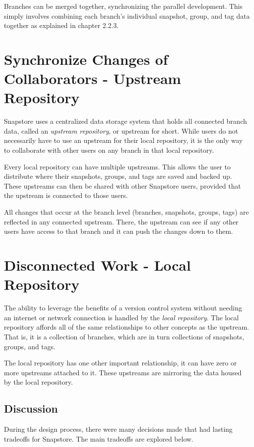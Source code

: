 Branches can be merged together, synchronizing the parallel development. This simply involves combining each branch's individual snapshot, group, and tag data together as explained in chapter 2.2.3.

\section{Synchronize Changes of Collaborators - Upstream Repository}

Snapstore uses a centralized data storage system that holds all connected branch data, called an \textit{upstream repository}, or upstream for short. While users do not necessarily have to use an upstream for their local repository, it is the only way to collaborate with other users on any branch in that local repository.

Every local repository can have multiple upstreams. This allows the user to distribute where their snapshots, groups, and tags are saved and backed up. These upstreams can then be shared with other Snapstore users, provided that the upstream is connected to those users. 

All changes that occur at the branch level (branches, snapshots, groups, tags) are reflected in any connected upstream. There, the upstream can see if any other users have access to that branch and it can push the changes down to them.

\section{Disconnected Work - Local Repository}

The ability to leverage the benefits of a version control system without needing an internet or network connection is handled by the \textit{local repository}. The local repository affords all of the same relationships to other concepts as the upstream. That is, it is a collection of branches, which are in turn collections of snapshots, groups, and tags.

The local repository has one other important relationship, it can have zero or more upstreams attached to it. These upstreams are mirroring the data housed by the local repository.

\subsection{Discussion}

During the design process, there were many decisions made that had lasting tradeoffs for Snapstore. The main tradeoffs are explored below.

